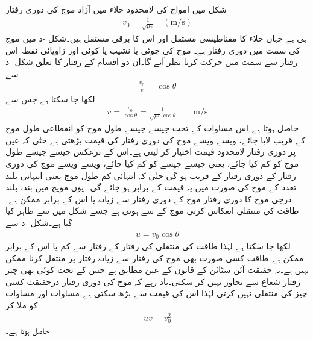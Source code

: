 شکل  میں  امواج کی   لامحدود خلاء میں آزاد موج کی دوری رفتار
\begin{align}
v_0=\frac{1}{\sqrt{\mu \epsilon}} \quad (\si{\meter \per \second})
\end{align}
ہی ہے جہاں خلاء کا مقناطیسی مستقل  اور اس کا برقی مستقل  ہیں۔شکل -د میں  موج کی  سمت میں دوری رفتار  ہے۔ موج کی چوٹی یا نشیب یا کوئی اور زاویائی نقطہ اس رفتار سے  سمت میں حرکت کرتا نظر آئے گا۔ان دو اقسام کے رفتار کا تعلق شکل -د سے
\begin{align}
\frac{v_0}{v}=\cos \theta
\end{align}
لکھا جا سکتا ہے جس سے
\begin{align}\label{مساوات_مویج_دوری_رفتار_تعلق_الف}
v=\frac{v_0}{\cos \theta}=\frac{1}{\sqrt{\mu \epsilon} \cos \theta} \quad \quad \si{\meter\per\second}
\end{align}
حاصل ہوتا ہے۔اس مساوات کے تحت جیسے جیسے طول موج کو انقطاعی طول موج کے قریب لایا جائے، ویسے ویسے  موج کی دوری رفتار کی قیمت بڑھتی ہے حتٰی کہ عین  پر دوری رفتار لامحدود قیمت اختیار کر لیتی ہے۔اس کے برعکس جیسے جیسے طول موج کو کم کیا جائے، یعنی جیسے جیسے  کو کم کیا جائے، ویسے ویسے  موج کی دوری رفتار  کے دوری رفتار کے قریب ہو گی حتٰی کہ انتہائی کم طول موج یعنی انتہائی بلند تعدد کے موج کی صورت میں یہ قیمت  کے برابر ہو جائے گی۔ یوں مویج میں بند، بلند درجی موج کا دوری رفتار  موج کے دوری رفتار سے زیادہ یا اس کے برابر ممکن ہے۔طاقت کی منتقلی انعکاس کرتی موج کے  سے ہوتی ہے جسے شکل میں  سے ظاہر کیا گیا ہے۔شکل -د سے
\begin{align}\label{مساوات_مویج_دوری_رفتار_تعلق_ب}
u=v_0 \cos \theta
\end{align}
لکھا جا سکتا ہے لہٰذا طاقت کی منتقلی کی رفتار  کے رفتار سے کم یا اس کے برابر ممکن ہے۔طاقت کسی صورت بھی  موج کی رفتار سے زیادہ رفتار پر منتقل کرنا ممکن نہیں ہے۔یہ حقیقت آئن سٹائن کے قانون کے عین مطابق ہے جس کے تحت کوئی بھی چیز رفتار شعاع سے تجاوز نہیں کر سکتی۔یاد رہے کہ  موج کی دوری رفتار درحقیقت کسی چیز کی منتقلی نہیں کرتی لہٰذا اس کی قیمت  سے بڑھ سکتی ہے۔مساوات  اور مساوات   کو ملا کر 
\begin{align}\label{مساوات_مویج_دوری_رفتار_تعلق_پ}
u v =v_0^2
\end{align}
حاصل ہوتا ہے۔

